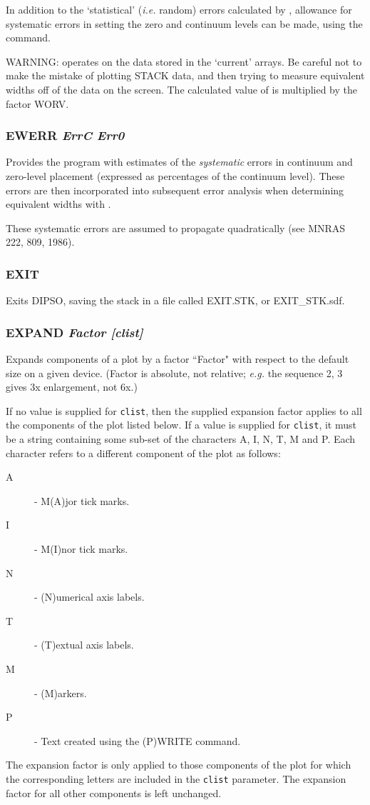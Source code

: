 \documentclass[twoside,11pt,noabs,nolof]{starlink}
\providecommand{\dipcom}[3]{\subsubsection*{\label{COM:#1}\textbf{#1} \emph{#2}}}
\newenvironment{dipdesc}{\begin{description}}{\end{description}}
\providecommand{\dipitem}[2]{ \item[{#1}] {#2} }
\begin{document}
In addition to the `statistical' (\emph{i.e.} random) errors calculated
by ,  allowance for systematic errors in setting the zero and
continuum levels can be made, using the   command.

WARNING:   operates on the data stored in the `current' arrays. Be
careful not to make the mistake of plotting STACK data, and then
trying to measure equivalent widths off of the data on the screen. The
calculated value of   is multiplied by the factor WORV.

\dipcom{EWERR}{ErrC Err0}{Estimates the systematic errors in continuum and zero-level values}
Provides the program with estimates of the \emph{systematic} errors in
continuum and zero-level placement (expressed as percentages of the
continuum level). These errors are then incorporated into subsequent
error analysis when determining equivalent widths with .

These systematic errors are assumed to propagate quadratically (see
MNRAS 222, 809, 1986).

\dipcom{EXIT}{}{Exits DIPSO, saving the stack in a binary file}
Exits DIPSO, saving the stack in a file called EXIT.STK, or EXIT\_STK.sdf.

\dipcom{EXPAND}{Factor [clist]}{Changes the sizes of individual components of a plot}
Expands components of a plot by a factor ``Factor" with respect to the default
size on a given device. (Factor is absolute, not relative; \emph{e.g.} the
sequence   2,   3 gives 3x enlargement, not 6x.)

If no value is supplied for {\texttt{clist}},  then the supplied expansion factor
applies to all the components of the plot listed below. If a value is supplied
for {\texttt{clist}},  it must be a string containing some sub-set of the characters
A, I, N, T, M and P. Each character refers to a different component of the plot
as follows:

\begin{dipdesc}
\dipitem{A}{ - M(A)jor tick marks.}
\dipitem{I}{ - M(I)nor tick marks.}
\dipitem{N}{ - (N)umerical axis labels.}
\dipitem{T}{ - (T)extual axis labels.}
\dipitem{M}{ - (M)arkers.}
\dipitem{P}{ - Text created using the (P)WRITE command.}
\end{dipdesc}

The expansion factor is only applied to those components of the plot for which
the corresponding letters are included in the {\texttt{clist}}  parameter. The
expansion factor for all other components is left unchanged.
\end{document}
